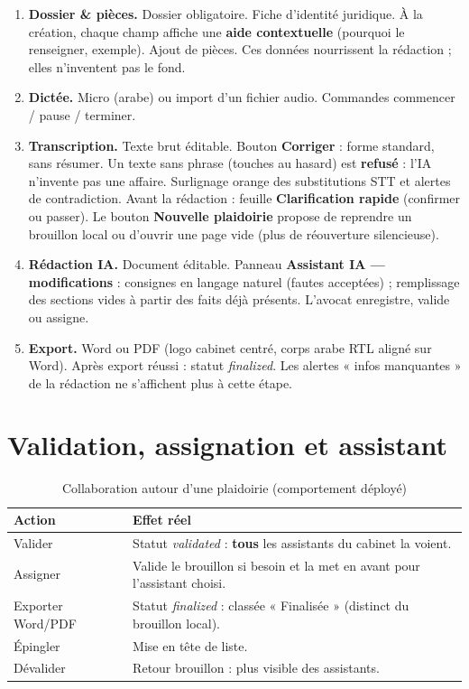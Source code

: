 \begin{enumerate}[leftmargin=1.4em]
  \item \textbf{Dossier \& pièces.} Dossier obligatoire. Fiche d'identité juridique. À la création, chaque champ affiche une \textbf{aide contextuelle} (pourquoi le renseigner, exemple). Ajout de pièces. Ces données nourrissent la rédaction ; elles n'inventent pas le fond.
  \item \textbf{Dictée.} Micro (arabe) ou import d'un fichier audio. Commandes commencer / pause / terminer.
  \item \textbf{Transcription.} Texte brut éditable. Bouton \textbf{Corriger} : forme standard, sans résumer. Un texte sans phrase (touches au hasard) est \textbf{refusé} : l'IA n'invente pas une affaire. Surlignage orange des substitutions STT et alertes de contradiction. Avant la rédaction : feuille \textbf{Clarification rapide} (confirmer ou passer). Le bouton \textbf{Nouvelle plaidoirie} propose de reprendre un brouillon local ou d'ouvrir une page vide (plus de réouverture silencieuse).
  \item \textbf{Rédaction IA.} Document éditable. Panneau \textbf{Assistant IA --- modifications} : consignes en langage naturel (fautes acceptées) ; remplissage des sections vides à partir des faits déjà présents. L'avocat enregistre, valide ou assigne.
  \item \textbf{Export.} Word ou PDF (logo cabinet centré, corps arabe RTL aligné sur Word). Après export réussi : statut \textit{finalized}. Les alertes « infos manquantes » de la rédaction ne s'affichent plus à cette étape.
\end{enumerate}

\section{Validation, assignation et assistant}

\begin{table}[H]
\centering
\caption{Collaboration autour d'une plaidoirie (comportement déployé)}
\label{tab:collab}
\small
\begin{tabular}{@{}lp{9.8cm}@{}}
\toprule
\textbf{Action} & \textbf{Effet réel} \\
\midrule
Valider & Statut \textit{validated} : \textbf{tous} les assistants du cabinet la voient. \\
Assigner & Valide le brouillon si besoin et la met en avant pour l'assistant choisi. \\
Exporter Word/PDF & Statut \textit{finalized} : classée « Finalisée » (distinct du brouillon local). \\
Épingler & Mise en tête de liste. \\
Dévalider & Retour brouillon : plus visible des assistants. \\
\bottomrule
\end{tabular}
\end{table}

